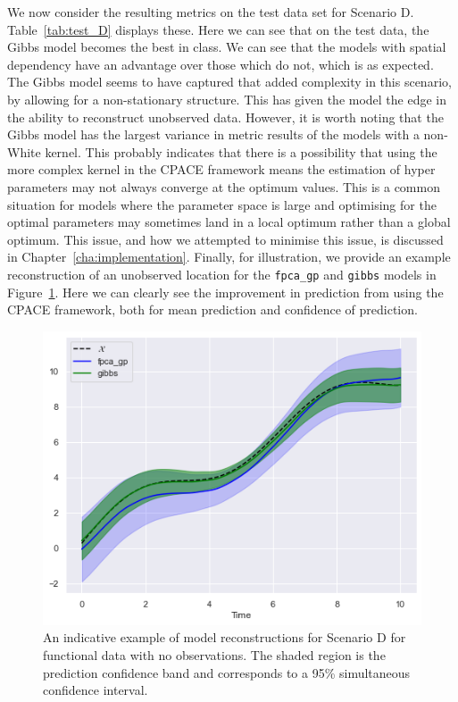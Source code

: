 We now consider the resulting metrics on the test data set for Scenario D.
Table~\ref{tab:test_D} displays these.
Here we can see that on the test data, the Gibbs model becomes the best in class.
We can see that the models with spatial dependency have an advantage over those which do not, which is as expected.
The Gibbs model seems to have captured that added complexity in this scenario, by allowing for a non-stationary structure. 
This has given the model the edge in the ability to reconstruct unobserved data.
However, it is worth noting that the Gibbs model has the largest variance in metric results of the models with a non-White kernel.
This probably indicates that there is a possibility that using the more complex kernel in the CPACE framework means the estimation of hyper parameters may not always converge at the optimum values.
This is a common situation for models where the parameter space is large and optimising for the optimal parameters may sometimes land in a local optimum rather than a global optimum. 
This issue, and how we attempted to minimise this issue, is discussed in Chapter~\ref{cha:implementation}.
Finally, for illustration, we provide an example reconstruction of an unobserved location for the \verb*|fpca_gp| and \verb*|gibbs| models in Figure~\ref{fig:sim_test_recon_D}.
Here we can clearly see the improvement in prediction from using the CPACE framework, both for mean prediction and confidence of prediction.

\begin{figure}
	\centering
	\includegraphics[width=\textwidth]{sim_test_recon_D}
	\caption[An indicative example of model reconstructions for Scenario D for functional data with no observations.]{An indicative example of model reconstructions for Scenario D for functional data with no observations. The shaded region is the prediction confidence band and corresponds to a 95\% simultaneous confidence interval.}
	\label{fig:sim_test_recon_D}
\end{figure}

